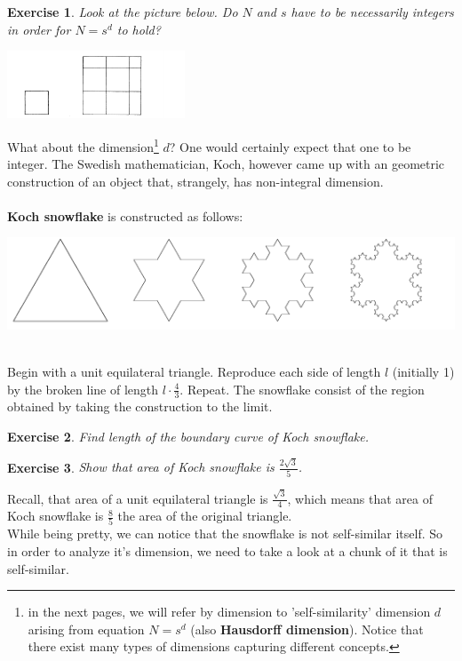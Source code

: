 \documentclass[12pt]{article}
\newtheorem{exercise}{Exercise}
\begin{document}
\begin{exercise}
Look at the picture below. Do $N$ and $s$ have to be necessarily integers in order for $N = s^d$ to hold?
\end{exercise}
\centerline{\includegraphics[width = 200px]{non_integer_square}\\}
\noindent What about the dimension\footnote{in the next pages, we will refer by dimension to 'self-similarity' dimension $d$ arising from equation $N = s^d$ (also \textbf{Hausdorff dimension}). Notice that there exist many types of dimensions capturing different concepts.} $d$? One would certainly expect that one to be integer. The Swedish mathematician, Koch, however came up with an geometric construction of an object that, strangely, has non-integral dimension. \\\\
\textbf{Koch snowflake} is constructed as follows: \\
\centerline{\includegraphics[width = \textwidth]{koch}}\\
Begin with a unit equilateral triangle. Reproduce each side of length $l$ (initially 1) by the broken line of length $l\cdot\frac{4}{3}$. Repeat. The snowflake consist of the region obtained by taking the construction to the limit. 
\begin{exercise}
Find length of the boundary curve of Koch snowflake.
\end{exercise}
\begin{exercise}
Show that area of Koch snowflake is $\frac{2\sqrt{3}}{5}$.
\end{exercise}
\noindent Recall, that area of a unit equilateral triangle is $\frac{\sqrt{3}}{4}$, which means that area of Koch snowflake is $\frac{8}{5}$ the area of the original triangle. \\
While being pretty, we can notice that the snowflake is not self-similar itself. So in order to analyze it's dimension, we need to take a look at a chunk of it that is self-similar. \\
\end{document}
